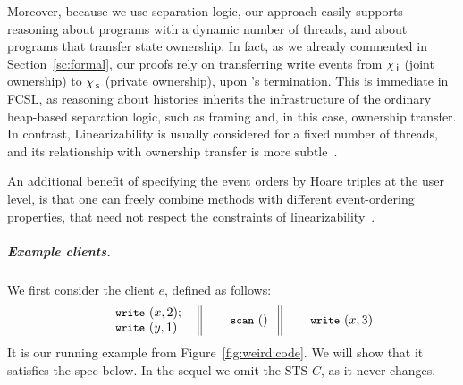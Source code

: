 
Moreover, because we use separation logic, our approach easily
supports reasoning about programs with a dynamic number of threads,
and about programs that transfer state ownership. In fact, as we
already commented in Section~\ref{sc:formal}, our proofs rely on
transferring write events from $\chi_{\, \mathsf{j}}$ (joint ownership) to $\chi_{\, \mathsf{s}}$
(private ownership), upon \jywrite's termination.
%
This is immediate in FCSL, as reasoning about histories inherits the
infrastructure of the ordinary heap-based separation logic, such as
framing and, in this case, ownership transfer.
%
In contrast, Linearizability is usually considered for a fixed number
of threads, and its relationship with ownership transfer is more
subtle~\cite{GotsmanY12+CONCUR12, CeroneGY+ICALP14}.

An additional benefit of specifying the event orders by Hoare triples
at the user level, is that one can freely combine methods with
different event-ordering properties, that need not respect the
constraints of linearizability~\cite{SergeyNBD+OOPSLA16}.





\subparagraph*{Example clients.}

We first consider the client $e$, defined as follows:
%
\[
\hfill\begin{array}{l||l||l}
        \begin{array}{c}
         \esc{write}~(x,2);\\ 
         \esc{write}~(y,1)~ 
        \end{array}~
& ~\esc{scan}~()~ &~\esc{write}~(x,3)  
\end{array}\hfill
\]
%
It is our running example from Figure~\ref{fig:weird:code}. We will
show that it satisfies the spec below. In the sequel we omit the STS
$C$, as it never changes.


